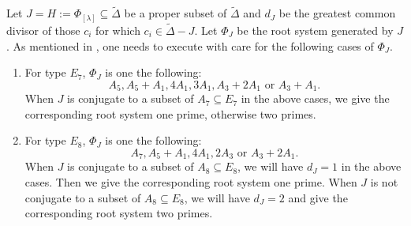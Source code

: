 \documentclass[reqno,12pt]{amsart}
\numberwithin{equation}{section}
\theoremstyle{plain}
\theoremstyle{definition}
\renewcommand{\subset}{\subseteq}
\begin{document}
 
 Let $J=H:=\Phi_{[\lambda]}\subset \tilde{\Delta}$ be a proper subset of $\tilde{\Delta}$ and $d_J$ be the greatest common divisor of those $c_i$ for which $c_i\in \tilde{\Delta}-J$. Let $\Phi_J$ be the root system generated by $J$.
As mentioned in \cite{som-98}, one needs to execute with care for the following cases of $\Phi_J$.
\begin{enumerate}
    \item For type $E_7$, $\Phi_J$ is one the following: \begin{equation}\label{E7-case}
        A_5,A_5+A_1,4A_1,3A_1,A_3+2A_1 \text{~or~} A_3+A_1.
    \end{equation}
When $J$ is conjugate to a subset of $A_7\subset E_7$ in the above cases, we give the corresponding root system  one prime, otherwise two primes.
\item For type $E_8$, $\Phi_J$ is one the following: \begin{equation}\label{E8-case}
    A_7,A_5+A_1,4A_1,2A_3 \text{~or~} A_3+2A_1.
\end{equation}
When $J$ is conjugate to a subset of $A_8\subset E_8$, we will have  $d_J=1$ in the above cases. Then we give the corresponding root system  one prime. When  $J$ is not conjugate to a subset of $A_8\subset E_8$, we will have $d_J=2$ and give the corresponding root system two primes.
\end{enumerate}
\end{document}
